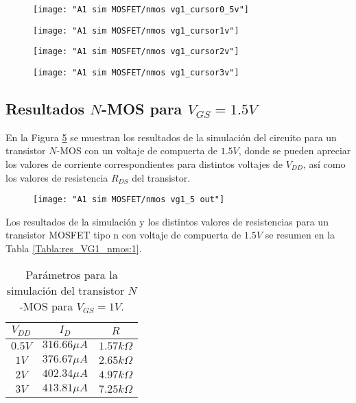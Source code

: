 \documentclass[9pt,technote]{IEEEtran}
\begin{document}
	\begin{figure}[H]
		\centering
		\texttt{[image: "A1 sim MOSFET/nmos vg1\_cursor0\_5v"]}
		\caption{}
		\label{fig:nmos-vg1cursor05v}
	\end{figure}
	
	\begin{figure}[H]
		\centering
		\texttt{[image: "A1 sim MOSFET/nmos vg1\_cursor1v"]}
		\caption{}
		\label{fig:nmos-vg1cursor1v}
	\end{figure}
	
	\begin{figure}[H]
		\centering
		\texttt{[image: "A1 sim MOSFET/nmos vg1\_cursor2v"]}
		\caption{}
		\label{fig:nmos-vg1cursor2v}
	\end{figure}
	
	\begin{figure}[H]
		\centering
		\texttt{[image: "A1 sim MOSFET/nmos vg1\_cursor3v"]}
		\caption{}
		\label{fig:nmos-vg1cursor3v}
	\end{figure}
	
	\pagebreak
	
	\subsection*{Resultados $N$-MOS para $V_{GS}=1.5V$}
	
	En la Figura \ref{fig:nmos-vg15-out} se muestran los resultados de la simulación del circuito para un transistor $N$-MOS con un voltaje de compuerta de $1.5V$, donde se pueden apreciar los valores de corriente correspondientes para distintos voltajes de $V_{DD}$, así como los valores de resistencia $R_{DS}$ del transistor.
	
	\begin{figure}[H]
		\centering
		\texttt{[image: "A1 sim MOSFET/nmos vg1\_5 out"]}
		\caption{}
		\label{fig:nmos-vg15-out}
	\end{figure}
    
    Los resultados de la simulación y los distintos valores de resistencias para un transistor MOSFET tipo n con voltaje de compuerta de $1.5V$ se resumen en la Tabla \ref{Tabla:res_VG1_nmos:1}.

	\begin{table}[H]
		\centering
		\begin{tabular}{|c|c|c|}
			\hline
			$V_{DD}$ & $I_{D}$ & $R$\\
			\hline
			$0.5V$ & $316.66 \mu A$ & $1.57 k\Omega$\\ 
			$1V$ & $376.67 \mu A$ &  $2.65 k\Omega$\\ 
			$2V$ & $402.34 \mu A$ &  $4.97 k\Omega$\\
			$3V$ & $413.81 \mu A$ &  $7.25 k\Omega$\\
			\hline
		\end{tabular}
		\caption{Parámetros para la simulación del transistor $N$-MOS para $V_{GS}=1V$.}
		\label{Tabla:res_VG15_nmos:1}
	\end{table}
\end{document}
